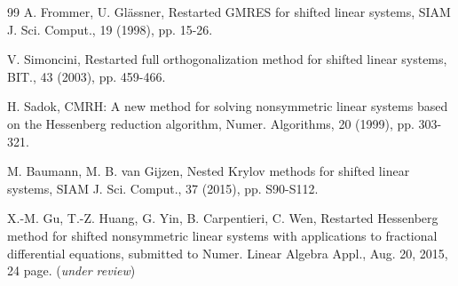 \documentclass{report}
\begin{document}
\begin{thebibliography}{99}
A. Frommer, U. Gl\"{a}ssner, Restarted GMRES for shifted linear systems,
SIAM J. Sci. Comput., 19 (1998), pp. 15-26.

V. Simoncini, Restarted full orthogonalization method for shifted linear
systems, BIT., 43 (2003), pp. 459-466.

H. Sadok, CMRH: A new method for solving nonsymmetric linear systems
based on the Hessenberg reduction algorithm, Numer. Algorithms, 20
(1999), pp. 303-321.

M. Baumann, M. B. van Gijzen, Nested Krylov methods for shifted linear
systems, SIAM J. Sci. Comput., 37 (2015), pp. S90-S112.

X.-M. Gu, T.-Z. Huang, G. Yin, B. Carpentieri, C. Wen, Restarted
Hessenberg method for shifted nonsymmetric linear systems with
applications to fractional differential equations, submitted to Numer.
Linear Algebra Appl., Aug. 20, 2015, 24 page. ({\it under review})

\end{thebibliography}
\end{document}
